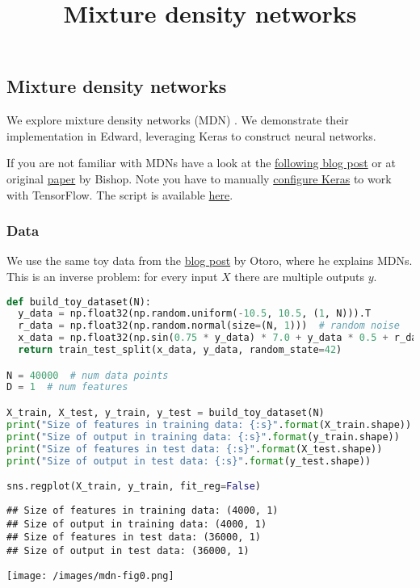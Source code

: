 \title{Mixture density networks}

\subsection{Mixture density networks}

We explore mixture density networks (MDN) \citep{bishop1994mixture}. We
demonstrate their implementation in Edward, leveraging Keras to
construct neural networks.

If you are not familiar with MDNs have a look at the
\href{http://cbonnett.github.io/MDN.html}{following blog post} or at
original
\href{http://research.microsoft.com/en-us/um/people/cmbishop/downloads/Bishop-NCRG-94-004.pdf}{paper}
by Bishop.
Note you have to manually \href{https://keras.io/backend/}
{configure Keras} to work with TensorFlow.
The script is available
\href{https://github.com/blei-lab/edward/blob/master/examples/tf_mixture_density_network_demo.py}
{here}.

\subsubsection{Data}

We use the same toy data from the \href{http://blog.otoro.net/2015/11/24/mixture-density-networks-with-tensorflow/}{blog post} by Otoro, where he explains MDNs. This is an inverse problem: for every input $X$ there are multiple outputs $y$.

\begin{lstlisting}[language=Python]
def build_toy_dataset(N):
  y_data = np.float32(np.random.uniform(-10.5, 10.5, (1, N))).T
  r_data = np.float32(np.random.normal(size=(N, 1)))  # random noise
  x_data = np.float32(np.sin(0.75 * y_data) * 7.0 + y_data * 0.5 + r_data * 1.0)
  return train_test_split(x_data, y_data, random_state=42)

N = 40000  # num data points
D = 1  # num features

X_train, X_test, y_train, y_test = build_toy_dataset(N)
print("Size of features in training data: {:s}".format(X_train.shape))
print("Size of output in training data: {:s}".format(y_train.shape))
print("Size of features in test data: {:s}".format(X_test.shape))
print("Size of output in test data: {:s}".format(y_test.shape))

sns.regplot(X_train, y_train, fit_reg=False)
\end{lstlisting}

\begin{lstlisting}
## Size of features in training data: (4000, 1)
## Size of output in training data: (4000, 1)
## Size of features in test data: (36000, 1)
## Size of output in test data: (36000, 1)
\end{lstlisting}
\texttt{[image: /images/mdn-fig0.png]}

